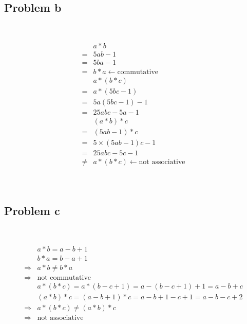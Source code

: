 \documentclass{article}
\begin{document}
~

\subsection*{Problem b}

~

\begin{equation*}
    \begin{split}
        &a*b\\
        =&5ab-1\\
        =&5ba-1\\
        =&b*a\leftarrow\text{commutative}\\
        &a*(b*c)\\
        =&a*(5bc-1)\\
        =&5a(5bc-1)-1\\
        =&25abc-5a-1\\
        &(a*b)*c\\
        =&(5ab-1)*c\\
        =&5\times(5ab-1)c-1\\
        =&25abc-5c-1\\
        \ne&a*(b*c)\leftarrow\text{not associative}\\
    \end{split}
\end{equation*}

~

\subsection*{Problem c}

~

\begin{equation*}
    \begin{split}
        &a*b=a-b+1\\
        &b*a=b-a+1\\
        \Rightarrow&a*b\ne b*a\\
        \Rightarrow&\text{not commutative}\\
        &a*(b*c)=a*(b-c+1)=a-(b-c+1)+1=a-b+c\\
        &(a*b)*c=(a-b+1)*c=a-b+1-c+1=a-b-c+2\\
        \Rightarrow&a*(b*c)\ne (a*b)*c\\
        \Rightarrow&\text{not associative}\\
    \end{split}
\end{equation*}
\end{document}
